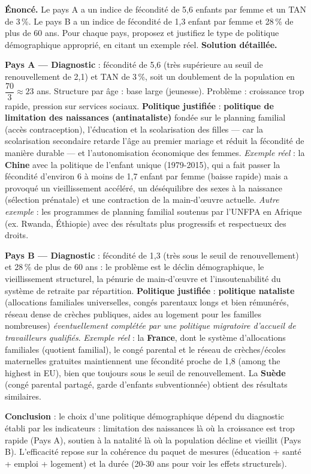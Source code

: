 \documentclass[11pt]{article}
\newcounter{popsec}
\newcounter{popsub}
\newcommand{\courssub}[1]{%
  \stepcounter{popsub}%
  \par\vspace{9pt}\noindent{\popxbold\fontsize{11.5}{13}\selectfont\color{popink}{\color{poporange}\thepopsec.\thepopsub}\hspace{6pt}#1}\par\nopagebreak\vspace{4pt}
}
\begin{document}
\courssub{Bilans contrastés et leçons}

\begin{exoresolu}
\textbf{Énoncé.} Le pays A a un indice de fécondité de 5,6 enfants par femme et un TAN de 3\,\%. Le pays B a un indice de fécondité de 1,3 enfant par femme et 28\,\% de plus de 60 ans. Pour chaque pays, proposez et justifiez le type de politique démographique approprié, en citant un exemple réel.
\tcblower
\textbf{Solution détaillée.}

\textbf{Pays A — Diagnostic} : fécondité de 5,6 (très supérieure au seuil de renouvellement de 2,1) et TAN de 3\,\%, soit un doublement de la population en $\dfrac{70}{3} \approx 23$ ans. Structure par âge : base large (jeunesse). Problème : croissance trop rapide, pression sur services sociaux.
\textbf{Politique justifiée} : \textbf{politique de limitation des naissances (antinataliste)} fondée sur le planning familial (accès contraception), l'éducation et la scolarisation des filles — car la scolarisation secondaire retarde l'âge au premier mariage et réduit la fécondité de manière durable — et l'autonomisation économique des femmes.
\emph{Exemple réel} : la \textbf{Chine} avec la politique de l'enfant unique (1979-2015), qui a fait passer la fécondité d'environ 6 à moins de 1,7 enfant par femme (baisse rapide) mais a provoqué un vieillissement accéléré, un déséquilibre des sexes à la naissance (sélection prénatale) et une contraction de la main-d'œuvre actuelle. \emph{Autre exemple} : les programmes de planning familial soutenus par l'UNFPA en Afrique (ex. Rwanda, Éthiopie) avec des résultats plus progressifs et respectueux des droits.

\textbf{Pays B — Diagnostic} : fécondité de 1,3 (très sous le seuil de renouvellement) et 28\,\% de plus de 60 ans : le problème est le déclin démographique, le vieillissement structurel, la pénurie de main-d'œuvre et l'insoutenabilité du système de retraite par répartition.
\textbf{Politique justifiée} : \textbf{politique nataliste} (allocations familiales universelles, congés parentaux longs et bien rémunérés, réseau dense de crèches publiques, aides au logement pour les familles nombreuses) \emph{éventuellement complétée par une politique migratoire d'accueil de travailleurs qualifiés}.
\emph{Exemple réel} : la \textbf{France}, dont le système d'allocations familiales (quotient familial), le congé parental et le réseau de crèches/écoles maternelles gratuites maintiennent une fécondité proche de 1,8 (among the highest in EU), bien que toujours sous le seuil de renouvellement. La \textbf{Suède} (congé parental partagé, garde d'enfants subventionnée) obtient des résultats similaires.

\textbf{Conclusion} : le choix d'une politique démographique dépend du diagnostic établi par les indicateurs : limitation des naissances là où la croissance est trop rapide (Pays A), soutien à la natalité là où la population décline et vieillit (Pays B). L'efficacité repose sur la cohérence du paquet de mesures (éducation + santé + emploi + logement) et la durée (20-30 ans pour voir les effets structurels).
\end{exoresolu}
\end{document}
